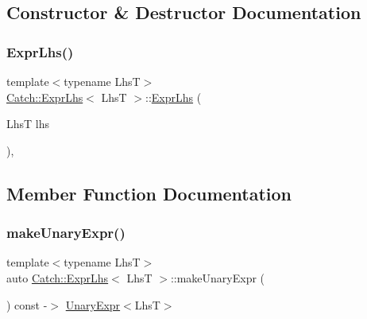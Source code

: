 \subsection{Constructor \& Destructor Documentation}
\mbox{\label{class_catch_1_1_expr_lhs_ad22c6af1a7d6993240624d299714a479}} 
\subsubsection{\texorpdfstring{Expr\+Lhs()}{ExprLhs()}}
{\footnotesize\ttfamily template$<$typename LhsT$>$ \\
\mbox{\hyperlink{class_catch_1_1_expr_lhs}{Catch\+::\+Expr\+Lhs}}$<$ LhsT $>$\+::\mbox{\hyperlink{class_catch_1_1_expr_lhs}{Expr\+Lhs}} (\begin{DoxyParamCaption}\item[{LhsT}]{lhs }\end{DoxyParamCaption})\hspace{0.3cm}{\ttfamily [inline]}, {\ttfamily [explicit]}}



\subsection{Member Function Documentation}
\mbox{\label{class_catch_1_1_expr_lhs_ab68bd6d5d3ae21b7fba9010150fba95d}} 
\subsubsection{\texorpdfstring{make\+Unary\+Expr()}{makeUnaryExpr()}}
{\footnotesize\ttfamily template$<$typename LhsT$>$ \\
auto \mbox{\hyperlink{class_catch_1_1_expr_lhs}{Catch\+::\+Expr\+Lhs}}$<$ LhsT $>$\+::make\+Unary\+Expr (\begin{DoxyParamCaption}{ }\end{DoxyParamCaption}) const -\/$>$ \mbox{\hyperlink{class_catch_1_1_unary_expr}{Unary\+Expr}}$<$LhsT$>$ \hspace{0.3cm}{\ttfamily [inline]}}

